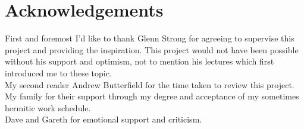\section*{Acknowledgements}
First and foremost I'd like to thank Glenn Strong for agreeing
to supervise this project and providing the inspiration. This
project would not have been possible without his support and
optimism, not to mention his lectures which first introduced
me to these topic. \\ 

\noindent My second reader Andrew Butterfield for the time taken to review
this project. \\

\noindent My family for their support through my degree and acceptance of
my sometimes hermitic work schedule. \\

\noindent Dave and Gareth for emotional support and criticism. 



